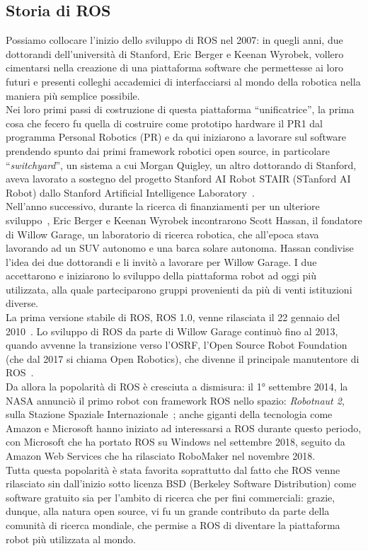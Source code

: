 \subsection{Storia di ROS}
Possiamo collocare l’inizio dello sviluppo di ROS nel 2007: in quegli anni, due dottorandi dell’università di Stanford, Eric Berger e Keenan Wyrobek, vollero cimentarsi nella creazione di una piattaforma software che permettesse ai loro futuri e presenti colleghi accademici di interfacciarsi al mondo della robotica nella maniera più semplice possibile.\\
Nei loro primi passi di costruzione di questa piattaforma ``unificatrice'', la prima cosa che fecero fu quella di costruire come prototipo hardware il PR1 dal programma Personal Robotics (PR) e da qui iniziarono a lavorare sul software prendendo spunto dai primi framework robotici open source, in particolare ``\textit{switchyard}'', un sistema a cui Morgan Quigley, un altro dottorando di Stanford, aveva lavorato a sostegno del progetto Stanford AI Robot STAIR (STanford AI Robot) dallo Stanford Artificial Intelligence Laboratory~\cite{19}.\\ Nell’anno successivo, durante la ricerca di finanziamenti per un ulteriore sviluppo~\cite{20}, Eric Berger e Keenan Wyrobek incontrarono Scott Hassan, il fondatore di Willow Garage, un laboratorio di ricerca robotica, che all'epoca stava lavorando ad un SUV autonomo e una barca solare autonoma. Hassan condivise l’idea dei due dottorandi e li invitò a lavorare per Willow Garage. I due accettarono e iniziarono lo sviluppo della piattaforma robot ad oggi più utilizzata, alla quale parteciparono gruppi provenienti da più di venti istituzioni diverse.\\
La prima versione stabile di ROS, ROS 1.0, venne rilasciata il 22 gennaio del 2010~\cite{21}. Lo sviluppo di ROS da parte di Willow Garage continuò fino al 2013, quando avvenne la transizione verso l’OSRF, l'Open Source Robot Foundation (che dal 2017 si chiama Open Robotics), che divenne il principale manutentore di ROS~\cite{22}.\\ Da allora la popolarità di ROS è cresciuta a dismisura: il 1° settembre 2014, la NASA annunciò il primo robot con framework ROS nello spazio:\textit{ Robotnaut 2}, sulla Stazione Spaziale Internazionale~\cite{23}; anche giganti della tecnologia come Amazon e Microsoft hanno iniziato ad interessarsi a ROS durante questo periodo, con Microsoft che ha portato ROS su Windows nel settembre 2018, seguito da Amazon Web Services che ha rilasciato RoboMaker nel novembre 2018.\\
Tutta questa popolarità è stata favorita soprattutto dal fatto che ROS venne rilasciato sin dall’inizio sotto licenza BSD (Berkeley Software Distribution) come software gratuito sia per l’ambito di ricerca che per fini commerciali: grazie, dunque, alla natura open source, vi fu un grande contributo da parte della comunità di ricerca mondiale, che permise a ROS di diventare la piattaforma robot più utilizzata al mondo.


